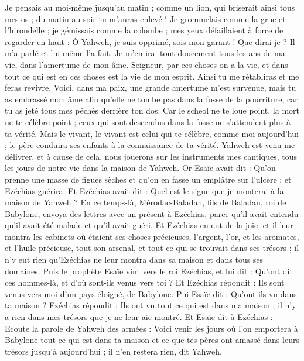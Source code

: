\begin{multicols}{2}
Je pensais au moi-même jusqu'au matin ; comme un lion, qui briserait ainsi tous mes os ; du matin au soir tu m'auras enlevé !
Je grommelais comme la grue et l'hirondelle ; je gémissais comme la colombe ; mes yeux défaillaient à force de regarder en haut : Ô Yahweh, je suis opprimé, sois mon garant !
Que dirai-je ? Il m'a parlé et lui-même l'a fait. Je m'en irai tout doucement tous les ans de ma vie, dans l'amertume de mon âme.
Seigneur, par ces choses on a la vie, et dans tout ce qui est en ces choses est la vie de mon esprit. Ainsi tu me rétabliras et me feras revivre.
Voici, dans ma paix, une grande amertume m'est survenue, mais tu as embrassé mon âme afin qu'elle ne tombe pas dans la fosse de la pourriture, car tu as jeté tous mes péchés derrière ton dos.
Car le scheol ne te loue point,  la mort ne te célèbre point ; ceux qui sont descendus dans la fosse ne s'attendent plus à ta vérité.
Mais le vivant, le vivant est celui qui te célèbre, comme moi aujourd'hui ; le père conduira ses enfants à la connaissance de ta vérité.
Yahweh est venu me délivrer, et à cause de cela, nous jouerons sur les instruments mes cantiques, tous les jours de notre vie dans la maison de Yahweh.
Or Esaïe avait dit : Qu'on prenne une masse de figues sèches et qu'on en fasse un emplâtre sur l'ulcère ; et Ezéchias guérira.
Et Ezéchias avait dit : Quel est le signe que je monterai à la maison de Yahweh ?
\VerseOne{}En ce temps-là, Mérodac-Baladan, fils de Baladan, roi de Babylone, envoya des lettres avec un présent à Ezéchias, parce qu'il avait entendu qu'il avait été malade et qu'il avait guéri.
Et Ezéchias en eut de la joie, et il leur montra les cabinets où étaient ses choses précieuses, l'argent, l'or, et les aromates, et l'huile précieuse, tout son arsenal, et tout ce qui se trouvait dans ses trésors ; il n'y eut rien qu'Ezéchias ne leur montra dans sa maison et dans tous ses domaines.
Puis le prophète Esaïe vint vers le roi Ezéchias, et lui dit : Qu'ont dit ces hommes-là, et d'où sont-ils venus vers toi ? Et Ezéchias répondit : Ils sont venus vers moi d'un pays éloigné, de Babylone.
Pui Esaïe dit : Qu'ont-ils vu dans ta maison ? Ezéchias répondit : Ils ont vu tout ce qui est dans ma maison ; il n'y a rien dans mes trésors que je ne leur aie montré.
Et Esaïe dit à Ezéchias : Ecoute la parole de Yahweh des armées :
Voici venir les jours où l'on emportera à Babylone tout ce qui est dans ta maison et ce que tes pères ont amassé dans leurs trésors jusqu'à aujourd'hui ; il n'en restera rien, dit Yahweh.

\end{multicols}
